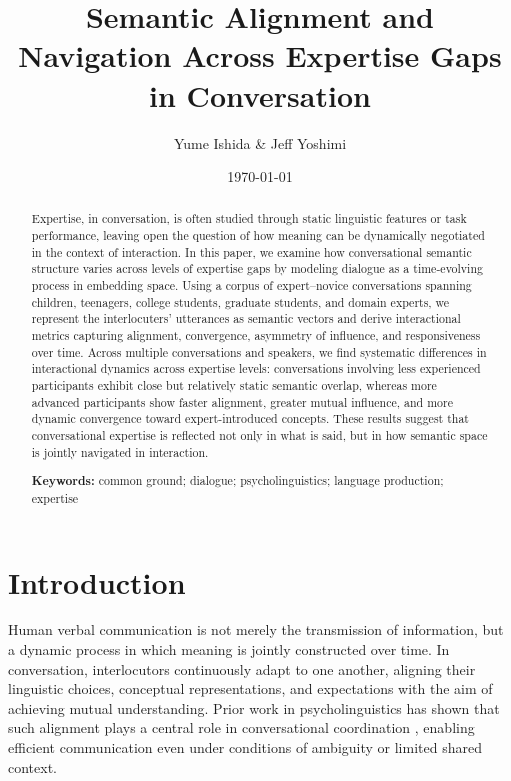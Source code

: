 \documentclass{article}
\theoremstyle{definition}
\numberwithin{table}{section}
\begin{document}
\title{Semantic Alignment and Navigation Across Expertise Gaps in Conversation}
\author{Yume Ishida \& Jeff Yoshimi}
\date{\today}
\maketitle                                      %

\begin{abstract}
Expertise, in conversation, is often studied through static linguistic features or task performance, leaving open the question of how meaning can be dynamically negotiated in the context of interaction. In this paper, we examine how conversational semantic structure varies across levels of expertise gaps by modeling dialogue as a time-evolving process in embedding space. Using a corpus of expert–novice conversations spanning children, teenagers, college students, graduate students, and domain experts, we represent the interlocuters' utterances as semantic vectors and derive interactional metrics capturing alignment, convergence, asymmetry of influence, and responsiveness over time. Across multiple conversations and speakers, we find systematic differences in interactional dynamics across expertise levels: conversations involving less experienced participants exhibit close but relatively static semantic overlap, whereas more advanced participants show faster alignment, greater mutual influence, and more dynamic convergence toward expert-introduced concepts. These results suggest that conversational expertise is reflected not only in what is said, but in how semantic space is jointly navigated in interaction.


\textbf{Keywords:}
common ground; dialogue; psycholinguistics; language production; expertise 
\end{abstract}

\section{Introduction}

Human verbal communication is not merely the transmission of information, but a dynamic process in which meaning is jointly constructed over time. In conversation, interlocutors continuously adapt to one another, aligning their linguistic choices, conceptual representations, and expectations with the aim of achieving mutual understanding. Prior work in psycholinguistics has shown that such alignment plays a central role in conversational coordination \citep{pickering_toward_2004}, enabling efficient communication even under conditions of ambiguity or limited shared context.
\end{document}

